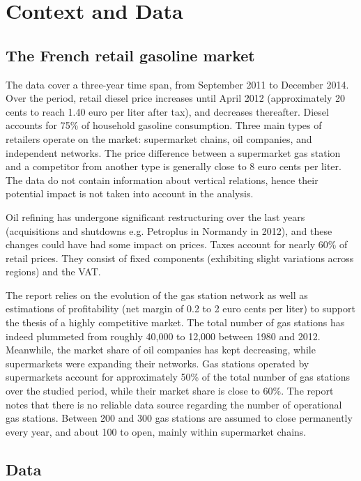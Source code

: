 \documentclass[english]{article}
\begin{document}
\section{Context and Data}

\subsection{The French retail gasoline market}

The data cover a three-year time span, from September 2011 to December 2014. Over the period, retail diesel price increases until April 2012 (approximately 20 cents to reach 1.40 euro per liter after tax), and decreases thereafter. Diesel accounts for 75\% of household gasoline consumption. Three main types of retailers operate on the market: supermarket chains, oil companies, and independent networks. The price difference between a supermarket gas station and a competitor from another type is generally close to 8 euro cents per liter. The data do not contain information about vertical relations, hence their potential impact is not taken into account in the analysis.

Oil refining has undergone significant restructuring over the last years (acquisitions and shutdowns e.g. Petroplus in Normandy in 2012), and these changes could have had some impact on prices. Taxes account for nearly 60$\%$ of retail prices. They consist of fixed components (exhibiting slight variations across regions) and the VAT.

The \cite{BEL12} report relies on the evolution of the gas station network as well as estimations of profitability (net margin of 0.2 to 2 euro cents per liter) to support the thesis of a highly competitive market. The total number of gas stations has indeed plummeted from roughly 40,000 to 12,000 between 1980 and 2012. Meanwhile, the market share of oil companies has kept decreasing, while supermarkets were expanding their networks. Gas stations operated by supermarkets account for approximately 50\% of the total number of gas stations over the studied period, while their market share is close to 60\%. The \cite{BEL12} report notes that there is no reliable data source regarding the number of operational gas stations. Between 200 and 300 gas stations are assumed to close permanently every year, and about 100 to open, mainly within supermarket chains.

\subsection{Data}
\end{document}
